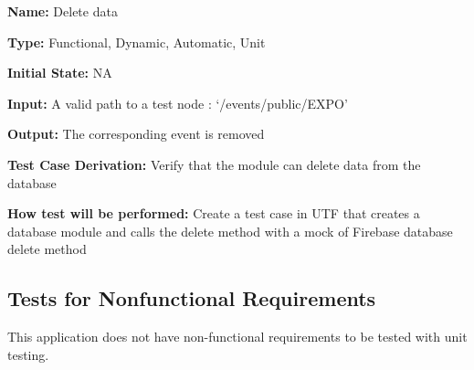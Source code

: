 \documentclass[12pt, titlepage]{article}
\begin{document}
\begin{enumerate}
\textbf{Name:} Delete data

\textbf{Type:} Functional, Dynamic, Automatic, Unit
					
\textbf{Initial State:} NA
					
\textbf{Input:} A valid path to a test node : `/events/public/EXPO'

\textbf{Output:} The corresponding event is removed

\textbf{Test Case Derivation:} Verify that the module can delete data from the database

\textbf{How test will be performed:} Create a test case in UTF that creates a database module and calls the delete method with a mock of Firebase database delete method
\end{enumerate}

\subsection{Tests for Nonfunctional Requirements}

This application does not have non-functional requirements to be tested with unit testing.  
\end{document}
